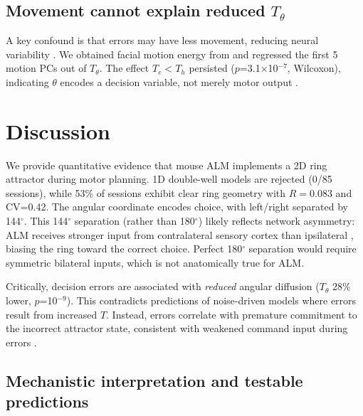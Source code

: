 \documentclass[11pt,a4paper]{article}
\begin{document}
\subsection{Movement cannot explain reduced \texorpdfstring{$T_\theta$}{T_theta}}

A key confound is that errors may have less movement, reducing neural variability \citep{churchland2019single,musall2019single}. We obtained facial motion energy from \citet{churchland2019single} and regressed the first 5 motion PCs out of \texorpdfstring{$T_\theta$}{T_theta}. The effect \texorpdfstring{$T_e < T_h$}{T_e < T_h} persisted (\texorpdfstring{$p$}{p}=3.1\texorpdfstring{$\times$}{x}10\texorpdfstring{$^{-7}$}{-7}, Wilcoxon), indicating \texorpdfstring{$\theta$}{theta} encodes a decision variable, not merely motor output \citep{steinmetz2019distributed}.

\section{Discussion}

We provide quantitative evidence that mouse ALM implements a 2D ring attractor during motor planning. 1D double-well models are rejected (0/85 sessions), while 53\% of sessions exhibit clear ring geometry with \texorpdfstring{$R=0.083$}{R=0.083} and CV=0.42. The angular coordinate encodes choice, with left/right separated by 144\texorpdfstring{$^{\circ}$}{°}. This 144\texorpdfstring{$^{\circ}$}{°} separation (rather than 180\texorpdfstring{$^{\circ}$}{°}) likely reflects network asymmetry: ALM receives stronger input from contralateral sensory cortex than ipsilateral \citep{guo2014flow}, biasing the ring toward the correct choice. Perfect 180\texorpdfstring{$^{\circ}$}{°} separation would require symmetric bilateral inputs, which is not anatomically true for ALM.

Critically, decision errors are associated with \textit{reduced} angular diffusion (\texorpdfstring{$T_\theta$}{T_theta} 28\% lower, \texorpdfstring{$p$}{p}=10\texorpdfstring{$^{-9}$}{-9}). This contradicts predictions of noise-driven models \citep{wang2002probabilistic,brunel2001effects} where errors result from increased \texorpdfstring{$T$}{T}. Instead, errors correlate with premature commitment to the incorrect attractor state, consistent with weakened command input during errors \citep{inagaki2019discrete,li2016robust}.

\subsection{Mechanistic interpretation and testable predictions}
\end{document}
